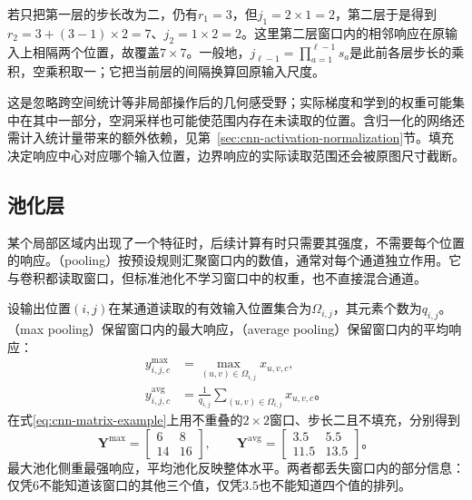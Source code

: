 若只把第一层的步长改为二，仍有$r_1=3$，但$j_1=2\times1=2$，第二层于是得到$r_2=3+(3-1)\times2=7$、$j_2=1\times2=2$。这里第二层窗口内的相邻响应在原输入上相隔两个位置，故覆盖$7\times7$。一般地，$j_{\ell-1}=\prod_{a=1}^{\ell-1}s_a$是此前各层步长的乘积，空乘积取一；它把当前层的间隔换算回原输入尺度。

这是忽略跨空间统计等非局部操作后的几何感受野；实际梯度和学到的权重可能集中在其中一部分，空洞采样也可能使范围内存在未读取的位置。含归一化的网络还需计入统计量带来的额外依赖，见第~\ref{sec:cnn-activation-normalization}节。填充决定响应中心对应哪个输入位置，边界响应的实际读取范围还会被原图尺寸截断。

\FloatBarrier

\subsection{池化层}
\label{sec:cnn-pooling}

某个局部区域内出现了一个特征时，后续计算有时只需要其强度，不需要每个位置的响应。（pooling）按预设规则汇聚窗口内的数值，通常对每个通道独立作用。它与卷积都读取窗口，但标准池化不学习窗口中的权重，也不直接混合通道。

设输出位置$(i,j)$在某通道读取的有效输入位置集合为$\Omega_{i,j}$，其元素个数为$q_{i,j}$。（max pooling）保留窗口内的最大响应，（average pooling）保留窗口内的平均响应：
\begin{equation}
  \begin{aligned}
    y_{i,j,c}^{\mathrm{max}}&=\max_{(u,v)\in\Omega_{i,j}}x_{u,v,c},\\
    y_{i,j,c}^{\mathrm{avg}}&=\frac1{q_{i,j}}
                   \sum_{(u,v)\in\Omega_{i,j}}x_{u,v,c}\text{。}
  \end{aligned}
  \label{eq:cnn-local-pooling}
\end{equation}
在式\eqref{eq:cnn-matrix-example}上用不重叠的$2\times2$窗口、步长二且不填充，分别得到
\begin{equation}
  \bm Y^{\mathrm{max}}=\begin{bmatrix}6&8\\14&16\end{bmatrix},\qquad
  \bm Y^{\mathrm{avg}}=\begin{bmatrix}3.5&5.5\\11.5&13.5\end{bmatrix}\text{。}
  \label{eq:cnn-pooling-example}
\end{equation}
最大池化侧重最强响应，平均池化反映整体水平。两者都丢失窗口内的部分信息：仅凭$6$不能知道该窗口的其他三个值，仅凭$3.5$也不能知道四个值的排列。

